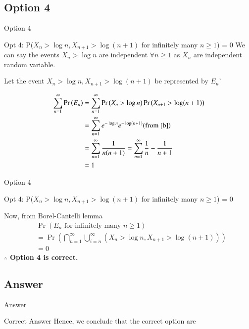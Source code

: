 \documentclass{beamer}
\providecommand{\pr}[1]{\ensuremath{\Pr\left(#1\right)}}
\providecommand{\pr}[1]{\ensuremath{\Pr\left(#1\right)}}
\providecommand{\brak}[1]{\ensuremath{\left(#1\right)}}
\theoremstyle{remark}
\numberwithin{equation}{subsection}
\begin{document}
\subsection{Option 4}
\begin{frame}{Option 4}
\begin{block}{Opt 4: P($X_n > \log n, X_{n+1}>\log (n+1)$ for infinitely many $n \geq 1$) = 0}
 We can say the events $X_n>\log n$ are independent $\forall n\geq 1$ as $X_n$ are independent random variable.
    
    Let the event $X_n > \log n,X_{n+1}>\log (n+1)$ be represented by $E_n$'
    
    \begin{align}
        \sum_{n=1}^{\infty}\pr{E_n}
        &= \sum_{n=1}^{\infty}\pr{X_n>\log n}\pr{X_{n+1}>\log (n+1)}\nonumber\\
        &=\sum_{n=1}^{\infty}e^{-\log n}e^{-\log (n+1)}\text{(from \eqref{b})}\nonumber\\
        &=\sum_{n=1}^{\infty}\frac{1}{n(n+1)}=\sum_{n=1}^{\infty}\frac{1}{n}-\frac{1}{n+1}\nonumber\\
        &=1
    \end{align}
    
\end{block}
\end{frame}

\begin{frame}{Option 4}
\begin{block}{Opt 4: P($X_n > \log n, X_{n+1}>\log (n+1)$ for infinitely many $n \geq 1$) = 0}

    Now, from Borel-Cantelli lemma
    \begin{align}
        &\pr{E_n\text{ for infinitely many }n\geq1}\nonumber\\
        &=\pr{\bigcap_{n=1}^{\infty}\bigcup_{i=n}^{\infty} \brak{X_n>\log n,X_{n+1}>\log (n+1)}}\nonumber\\
        &=0\nonumber
    \end{align}
    $\therefore$ \textbf{Option 4 is correct.}

\end{block}
\end{frame}


\subsection{Answer}

\begin{frame}{Answer}
\begin{block}{Correct Answer}
Hence, we conclude that the correct option are 


\end{block}
   
\end{frame}
\end{document}
